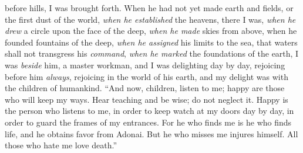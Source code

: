 \begin{biblechapter}
before hills, I was brought forth.
\verse When he had not yet made earth and fields, 
or the first dust of the world,
\verse \textit{when he established} the heavens, there I was, 
\textit{when he drew} a circle upon the face of the deep,
\verse \textit{when he made} skies from above, 
when he founded fountains of the deep,
\verse \textit{when he assigned} his limits to the sea, 
that waters shall not transgress his \textit{command}, 
\textit{when he marked} the foundations of the earth,
\verse I was \textit{beside} him, a master workman, 
and I was delighting day by day, 
rejoicing before him \textit{always},
\verse rejoicing in the world of his earth, 
and my delight was with the children of humankind.
 “And now, children, listen to me; 
happy are those who will keep my ways.
\verse Hear teaching and be wise; 
do not neglect it.
\verse Happy is the person who listens to me, 
in order to keep watch at my doors day by day, 
in order to guard the frames of my entrances.
\verse For he who finds me is he who finds life, 
and he obtains favor from Adonai.
\verse But he who misses me injures himself. 
All those who hate me love death.”
\end{biblechapter}

